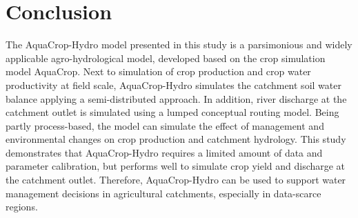 \section{Conclusion}
The AquaCrop-Hydro model presented in this study is a parsimonious and widely applicable agro-hydrological model, developed based on the crop simulation model AquaCrop. Next to simulation of crop production and crop water productivity at field scale, AquaCrop-Hydro simulates the catchment soil water balance applying a semi-distributed approach. In addition, river discharge at the catchment outlet is simulated using a lumped conceptual routing model. Being partly process-based, the model can simulate the effect of management and environmental changes on crop production and catchment hydrology. This study demonstrates that AquaCrop-Hydro requires a limited amount of data and parameter calibration, but performs well to simulate crop yield and discharge at the catchment outlet. Therefore, AquaCrop-Hydro can be used to support water management decisions in agricultural catchments, especially in data-scarce regions.


\cleardoublepage